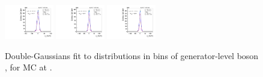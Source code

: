 \begin{figure}[htb]
\includegraphics[width=0.19\textwidth]{plots/Appendix_Recoil_Fits/WmpMC_PF_5TeV_2G/pfu2fit_32.pdf}
\includegraphics[width=0.19\textwidth]{plots/Appendix_Recoil_Fits/WmpMC_PF_5TeV_2G/pfu2fit_33.pdf}
\includegraphics[width=0.19\textwidth]{plots/Appendix_Recoil_Fits/WmpMC_PF_5TeV_2G/pfu2fit_34.pdf}
\caption{Double-Gaussians fit to \uprp distributions in bins of generator-level boson \pt, for \Wp MC at \serag.}
\label{fig:a:recoil:fit:wp:u2:5}
\end{figure}